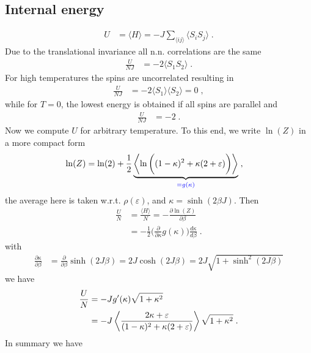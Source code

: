 \subsection{Internal energy}
%
\begin{align*}
U &= \langle H \rangle = -J\sum_{\langle ij \rangle} \langle S_{i}S_{j}\rangle\;.
\end{align*}
%
Due to the translational invariance all n.n. correlations are
the same
\begin{align*}
\frac{U}{NJ} &=-2 \langle S_{1}S_{2}\rangle\;.
\end{align*}
For high temperatures the spins are uncorrelated resulting in
\begin{align*}
\frac{U}{NJ} &=-2 \langle S_{1}\rangle \langle  S_{2}\rangle = 0\;,
\end{align*}
while for $T=0$, the lowest energy is obtained if all spins are parallel 
and
\begin{align*}
\frac{U}{NJ} &=-2\;.
\end{align*}
Now we compute $U$ for arbitrary temperature.
%
To this end, we write $\ln(Z)$ in a more compact form
%
\begin{align*}
\ln(Z) &= \ln(2) +\frac{1}{2} 
\underbrace{
\left\langle\ln \bigg((1-\kappa)^{2} + \kappa (2+\varepsilon) \bigg)\right\rangle
}_{\color{blue} = g(\kappa)}\;,
\end{align*}
%
the average here is taken w.r.t. $\rho(\varepsilon)$, and $\kappa=\sinh(2 \beta J)$. Then
\begin{align*}
\frac{U}{N} &= \frac{\langle H \rangle}{N} = -\frac{\partial \ln(Z)}{\partial \beta}\\
&=-\frac{1}{2} \big(\frac{\partial }{\partial \kappa} g(\kappa) \big)
\frac{d \kappa}{d\beta}\;.
\end{align*}
%
with
%
\begin{align*}
\frac{\partial \kappa}{\partial \beta}&= \frac{\partial }{\partial \beta} \sinh(2 J \beta) = 2 J \cosh(2 J \beta)= 2J \sqrt{ 1+\sinh^{2}(2 J\beta) }
\end{align*}
%
we have 
%
\begin{align*}
\frac{U}{N}&=-J g'(\kappa) 
\sqrt{1+\kappa^{2}} \\
&=-J \left\langle
\frac{2\kappa +\varepsilon}{(1-\kappa)^{2}+\kappa(2+\varepsilon)}
\right\rangle
\sqrt{1+\kappa^{2}} \;.
\end{align*}
%
In summary we have
%
%

